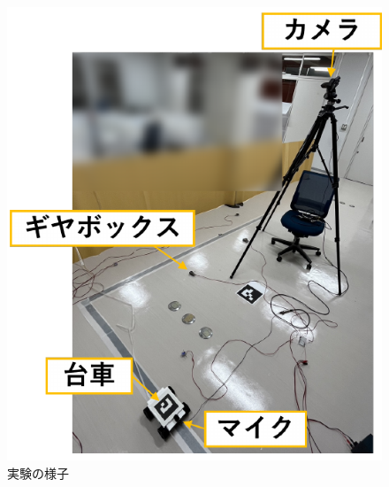 \documentclass[../main]{subfiles}
\begin{document}
\begin{figure}[tb]
  \centering
  \includegraphics[keepaspectratio, width=0.8\linewidth]{experiment.pdf}
  \caption{実験の様子}
\end{figure}
\end{document}
